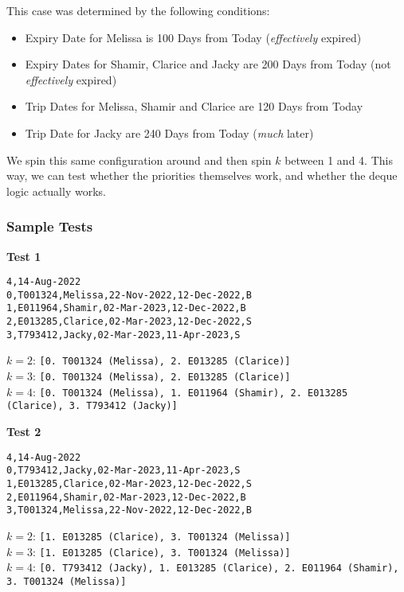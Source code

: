 \documentclass{article}
\begin{document}
This case was determined by the following conditions:
\begin{itemize}
    \item Expiry Date for Melissa is 100 Days from Today (\textit{effectively} expired)
    \item Expiry Dates for Shamir, Clarice and Jacky are 200 Days from Today (not \textit{effectively} expired)
    \item Trip Dates for Melissa, Shamir and Clarice are 120 Days from Today
    \item Trip Date for Jacky are 240 Days from Today (\textit{much} later)
\end{itemize}

We spin this same configuration around and then spin $k$ between 1 and 4. This way, we can test whether the priorities themselves work, and whether the deque logic actually works.

\subsubsection{Sample Tests}
\textbf{Test 1}
\begin{tcolorbox}
\texttt{4,14-Aug-2022} \\
\texttt{0,T001324,Melissa,22-Nov-2022,12-Dec-2022,B} \\
\texttt{1,E011964,Shamir,02-Mar-2023,12-Dec-2022,B} \\
\texttt{2,E013285,Clarice,02-Mar-2023,12-Dec-2022,S} \\
\texttt{3,T793412,Jacky,02-Mar-2023,11-Apr-2023,S}
\end{tcolorbox}
\begin{tcolorbox}
$k = 2$: \texttt{[0. T001324 (Melissa), 2. E013285 (Clarice)]} \\
$k = 3$: \texttt{[0. T001324 (Melissa), 2. E013285 (Clarice)]} \\
$k = 4$: \texttt{[0. T001324 (Melissa), 1. E011964 (Shamir), 2. E013285 (Clarice), 3. T793412 (Jacky)]}
\end{tcolorbox}

\newpage
\textbf{Test 2}
\begin{tcolorbox}
\texttt{4,14-Aug-2022} \\
\texttt{0,T793412,Jacky,02-Mar-2023,11-Apr-2023,S} \\
\texttt{1,E013285,Clarice,02-Mar-2023,12-Dec-2022,S} \\
\texttt{2,E011964,Shamir,02-Mar-2023,12-Dec-2022,B} \\
\texttt{3,T001324,Melissa,22-Nov-2022,12-Dec-2022,B}
\end{tcolorbox}
\begin{tcolorbox}
$k = 2$: \texttt{[1. E013285 (Clarice), 3. T001324 (Melissa)]} \\
$k = 3$: \texttt{[1. E013285 (Clarice), 3. T001324 (Melissa)]} \\
$k = 4$: \texttt{[0. T793412 (Jacky), 1. E013285 (Clarice), 2. E011964 (Shamir), 3. T001324 (Melissa)]}
\end{tcolorbox}
\end{document}
